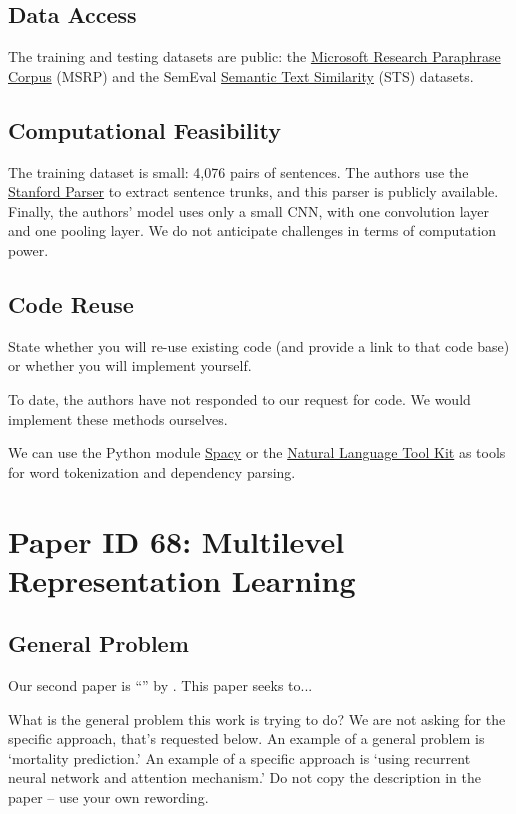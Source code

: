 \documentclass[11pt,a4paper]{article}
\begin{document}
\subsection{Data Access}
The training and testing datasets are public: the \href{https://www.microsoft.com/en-us/download/details.aspx?id=52398}{Microsoft Research Paraphrase Corpus} (MSRP) and the SemEval \href{https://github.com/brmson/dataset-sts/tree/master/data/sts/semeval-sts}{Semantic Text Similarity} (STS) datasets.

\subsection{Computational Feasibility}
The training dataset is small: 4,076 pairs of sentences. The authors use the \href{https://nlp.stanford.edu/software/lex-parser.shtml}{Stanford Parser} to extract sentence trunks, and this parser is publicly available. Finally, the authors' model uses only a small CNN, with one convolution layer and one pooling layer. We do not anticipate challenges in terms of computation power. 

\subsection{Code Reuse}
State whether you will re-use existing code (and provide a link to that code base) or whether you will implement yourself.

To date, the authors have not responded to our request for code. We would implement these methods ourselves. 

We can use the Python module \href{https://spacy.io/}{Spacy} or the \href{https://www.nltk.org/}{Natural Language Tool Kit} as tools for word tokenization and dependency parsing. 

\section{Paper ID 68: Multilevel Representation Learning}
\subsection{General Problem}
Our second paper is ``'' by \citeauthor*{sohn_2020}. This paper seeks to... 


What is the general problem this work is trying to do? We are not asking for the specific approach, that’s requested below. An example of a general problem is ‘mortality prediction.’ An example of a specific approach is ‘using recurrent neural network and attention mechanism.’ Do not copy the description in the paper – use your own rewording.
\end{document}
